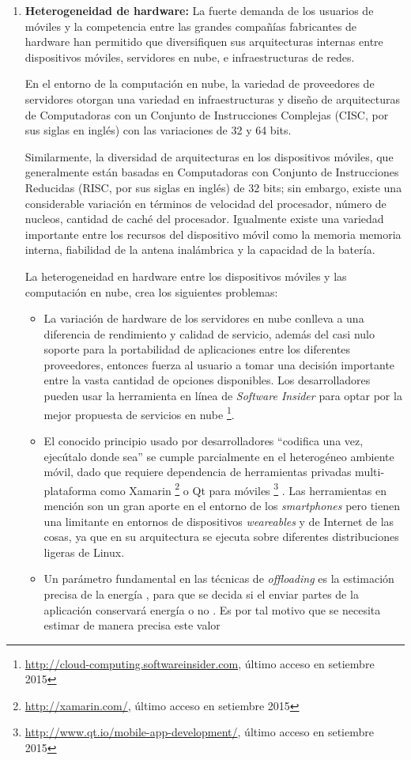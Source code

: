 \begin{enumerate}
 \item \textbf{Heterogeneidad de hardware:} La fuerte demanda de los usuarios de móviles y la competencia entre las grandes compañías 
 fabricantes de hardware han permitido que diversifiquen sus arquitecturas internas entre dispositivos móviles, servidores en nube, e 
 infraestructuras de redes. 
 
 En el entorno de la computación en nube, la variedad de proveedores de servidores otorgan una variedad en infraestructuras y diseño 
 de arquitecturas de Computadoras con un Conjunto de Instrucciones Complejas (CISC, por sus siglas en inglés) con las variaciones de 32 y
 64 bits. 
 
 Similarmente, la diversidad de arquitecturas en los dispositivos móviles, que generalmente están basadas en Computadoras con Conjunto de Instrucciones
 Reducidas (RISC, por sus siglas en inglés) de 32 bits; sin embargo, existe una considerable variación en términos de velocidad del procesador,
 número de nucleos, cantidad de caché del procesador. Igualmente existe una variedad importante entre los recursos del dispositivo móvil como
 la memoria memoria interna, fiabilidad de la antena inalámbrica y la capacidad de la batería.
 
 La heterogeneidad en hardware entre los dispositivos móviles y las computación en nube, crea los siguientes problemas: 
 
 \begin{itemize}
  \item La variación de hardware de los servidores en nube conlleva a una diferencia de rendimiento y calidad de servicio, además  del casi nulo
  soporte para la portabilidad de aplicaciones entre los diferentes proveedores, entonces fuerza al usuario a tomar una decisión 
  importante entre la vasta cantidad de opciones disponibles. Los desarrolladores pueden usar la herramienta en línea de \textit{Software Insider}
  para optar por la mejor propuesta de servicios en nube \footnote{\url{http://cloud-computing.softwareinsider.com}, último acceso en setiembre 2015}.
  \item El conocido principio usado por desarrolladores ``codifica una vez, ejecútalo donde sea'' se cumple parcialmente en el 
  heterogéneo ambiente móvil, dado que requiere dependencia de herramientas privadas  
  multi-plataforma como Xamarin \footnote{ \url{http://xamarin.com/}, último acceso en setiembre 2015} o Qt para móviles 
  \footnote{ \url{http://www.qt.io/mobile-app-development/}, último acceso en setiembre 2015}
  . Las herramientas en mención son un gran aporte en el entorno de los \textit{smartphones} pero tienen
  una limitante en entornos de dispositivos \textit{weareables} y de Internet de las cosas, ya que en su arquitectura se ejecuta sobre diferentes
  distribuciones ligeras de Linux.
  \item Un parámetro fundamental en las técnicas de \textit{offloading} es la estimación precisa de la energía \cite{sanaei2014heterogeneity},
  para
  que se decida si el enviar partes de la aplicación conservará energía o no \cite{5445167}. Es por tal motivo que se necesita estimar de manera precisa
  este valor 
  

\end{itemize}
\end{enumerate}
